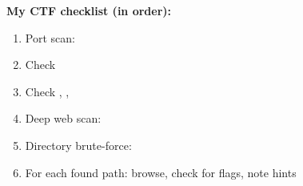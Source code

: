 \begin{takebox}
\begin{takebox}
\textbf{My CTF checklist (in order):}
\begin{enumerate}
  \item Port scan: 
  \item Check 
  \item Check , , 
  \item Deep web scan: 
  \item Directory brute-force: 
  \item For each found path: browse, check for flags, note hints
\end{enumerate}
\end{takebox}

\end{takebox}